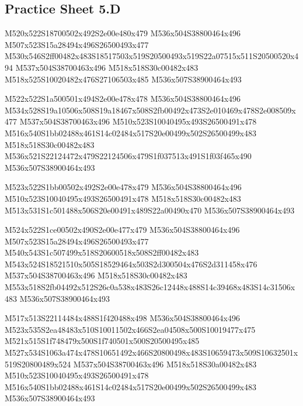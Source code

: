 \documentclass{article}
\begin{document}
\subsection{Practice Sheet 5.D}

\begin{multicols}{5}
\begin{center}

M520x522S18700502x492S2e00e480x479 %
M536x504S38800464x496 %
M507x523S15a28494x496S26500493x477 %
M530x546S2ff00482x483S18517503x519S20500493x519S22a07515x511S20500520x494 %
M537x504S38700463x496 %
M518x518S30c00482x483 %
M518x525S10020482x476S27106503x485 %
M536x507S38900464x493 %
\vfil
\columnbreak

M522x522S1a500501x494S2e00e478x478 %
M536x504S38800464x496 %
M534x528S19a10506x508S19a18467x508S2fb00492x473S2e010469x478S2e008509x477 %
M537x504S38700463x496 %
M510x523S10040495x493S26500491x478 %
M516x540S1bb02488x461S14c02484x517S20e00499x502S26500499x483 %
M518x518S30c00482x483 %
M536x521S22124472x479S22124506x479S1f037513x491S1f03f465x490 %
M536x507S38900464x493 %
\vfil
\columnbreak

M523x522S1bb00502x492S2e00e478x479 %
M536x504S38800464x496 %
M510x523S10040495x493S26500491x478 %
M518x518S30c00482x483 %
M513x531S1c501488x506S20e00491x489S22a00490x470 %
M536x507S38900464x493 %
\vfil
\columnbreak

M524x522S1ce00502x490S2e00e477x479 %
M536x504S38800464x496 %
M507x523S15a28494x496S26500493x477 %
M540x543S1c507499x518S20600518x508S2ff00482x483 %
M543x524S18521510x505S18529464x503S2d300504x476S2d311458x476 %
M537x504S38700463x496 %
M518x518S30c00482x483 %
M553x518S2fb04492x512S26c0a538x483S26c12448x488S14c39468x483S14c31506x483 %
M536x507S38900464x493 %
\vfil
\columnbreak

M517x513S22114484x488S1f420488x498 %
M536x504S38800464x496 %
M523x535S2ea48483x510S10011502x466S2ea04508x500S10019477x475 %
M521x515S1f748479x500S1f740501x500S20500495x485 %
M527x534S1063a474x478S10651492x466S20800498x483S10659473x509S10632501x519S20800489x524 %
M537x504S38700463x496 %
M518x518S30a00482x483 %
M510x523S10040495x493S26500491x478 %
M516x540S1bb02488x461S14c02484x517S20e00499x502S26500499x483 %
M536x507S38900464x493 %
\vfil

\end{center}
\end{multicols}
\end{document}
